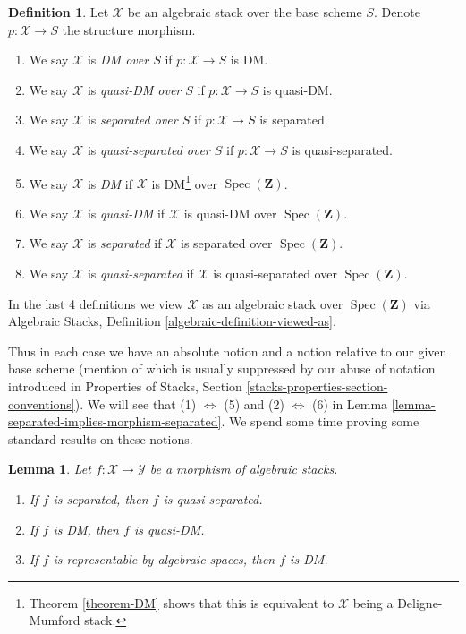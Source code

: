 \documentclass{stacks-project}
\theoremstyle{plain}
\newtheorem{lemma}[subsection]{Lemma}
\theoremstyle{definition}
\newtheorem{definition}[subsection]{Definition}
\theoremstyle{remark}
\numberwithin{equation}{subsection}
\def\Spec{\mathop{\mathrm{Spec}}}
\begin{document}
\begin{definition}
\label{definition-absolute-separated}
Let $\mathcal{X}$ be an algebraic stack over the base scheme $S$.
Denote $p : \mathcal{X} \to S$ the structure morphism.
\begin{enumerate}
\item We say $\mathcal{X}$ is {\it DM over $S$}
if $p : \mathcal{X} \to S$ is DM.
\item We say $\mathcal{X}$ is {\it quasi-DM over $S$}
if $p : \mathcal{X} \to S$ is quasi-DM.
\item We say $\mathcal{X}$ is {\it separated over $S$}
if $p : \mathcal{X} \to S$ is separated.
\item We say $\mathcal{X}$ is {\it quasi-separated over $S$} if
$p : \mathcal{X} \to S$ is quasi-separated.
\item We say $\mathcal{X}$ is {\it DM}
if $\mathcal{X}$ is DM\footnote{Theorem \ref{theorem-DM} shows
that this is equivalent to $\mathcal{X}$ being a Deligne-Mumford stack.}
over $\Spec(\mathbf{Z})$.
\item We say $\mathcal{X}$ is {\it quasi-DM}
if $\mathcal{X}$ is quasi-DM over $\Spec(\mathbf{Z})$.
\item We say $\mathcal{X}$ is {\it separated} if $\mathcal{X}$
is separated over $\Spec(\mathbf{Z})$.
\item We say $\mathcal{X}$ is {\it quasi-separated} if $\mathcal{X}$
is quasi-separated over $\Spec(\mathbf{Z})$.
\end{enumerate}
In the last 4 definitions we view $\mathcal{X}$
as an algebraic stack over $\Spec(\mathbf{Z})$
via
Algebraic Stacks, Definition \ref{algebraic-definition-viewed-as}.
\end{definition}

\noindent
Thus in each case we have an absolute notion and a notion relative to
our given base scheme (mention of which is usually suppressed by our
abuse of notation introduced in
Properties of Stacks, Section \ref{stacks-properties-section-conventions}).
We will see that (1) $\Leftrightarrow$ (5) and (2) $\Leftrightarrow$ (6) in
Lemma \ref{lemma-separated-implies-morphism-separated}.
We spend some time proving some standard results on these notions.

\begin{lemma}
\label{lemma-trivial-implications}
Let $f : \mathcal{X} \to \mathcal{Y}$ be a morphism of algebraic stacks.
\begin{enumerate}
\item If $f$ is separated, then $f$ is quasi-separated.
\item If $f$ is DM, then $f$ is quasi-DM.
\item If $f$ is representable by algebraic spaces, then $f$ is DM.
\end{enumerate}
\end{lemma}
\end{document}
